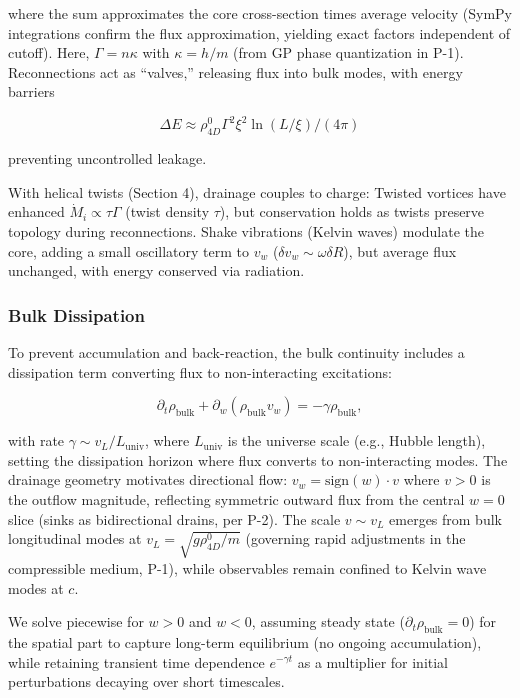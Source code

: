 where the sum approximates the core cross-section times average velocity (SymPy integrations confirm the flux approximation, yielding exact factors independent of cutoff). Here, $\Gamma = n \kappa$ with $\kappa = h / m$ (from GP phase quantization in P-1). Reconnections act as ``valves,'' releasing flux into bulk modes, with energy barriers

\begin{equation}
\Delta E \approx \rho_{4D}^0 \Gamma^2 \xi^2 \ln(L / \xi) / (4\pi)
\end{equation}

preventing uncontrolled leakage.

With helical twists (Section 4), drainage couples to charge: Twisted vortices have enhanced $\dot{M}_i \propto \tau \Gamma$ (twist density $\tau$), but conservation holds as twists preserve topology during reconnections. Shake vibrations (Kelvin waves) modulate the core, adding a small oscillatory term to $v_w$ ($\delta v_w \sim \omega \delta R$), but average flux unchanged, with energy conserved via radiation.

\subsubsection{Bulk Dissipation}
To prevent accumulation and back-reaction, the bulk continuity includes a dissipation term converting flux to non-interacting excitations:

\begin{equation}
\partial_t \rho_{\text{bulk}} + \partial_w (\rho_{\text{bulk}} v_w) = -\gamma \rho_{\text{bulk}},
\end{equation}

with rate $\gamma \sim v_L / L_{\text{univ}}$, where $L_{\text{univ}}$ is the universe scale (e.g., Hubble length), setting the dissipation horizon where flux converts to non-interacting modes. The drainage geometry motivates directional flow: $v_w = \text{sign}(w) \cdot v$ where $v > 0$ is the outflow magnitude, reflecting symmetric outward flux from the central $w=0$ slice (sinks as bidirectional drains, per P-2). The scale $v \sim v_L$ emerges from bulk longitudinal modes at $v_L = \sqrt{g \rho_{4D}^0 / m}$ (governing rapid adjustments in the compressible medium, P-1), while observables remain confined to Kelvin wave modes at $c$.

We solve piecewise for $w > 0$ and $w < 0$, assuming steady state ($\partial_t \rho_{\text{bulk}} = 0$) for the spatial part to capture long-term equilibrium (no ongoing accumulation), while retaining transient time dependence $e^{-\gamma t}$ as a multiplier for initial perturbations decaying over short timescales.

